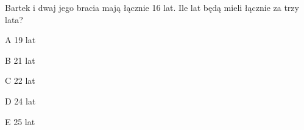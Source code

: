 \begin{tresc}
Bartek i dwaj jego bracia mają łącznie 16 lat. Ile lat będą mieli łącznie za trzy lata?
\end{tresc}
\begin{wariant}{A} 19 lat \end{wariant}
\begin{wariant}{B} 21 lat \end{wariant}
\begin{wariant}{C} 22 lat \end{wariant}
\begin{wariant}{D} 24 lat \end{wariant}
\begin{wariant}{E} 25 lat \end{wariant}

